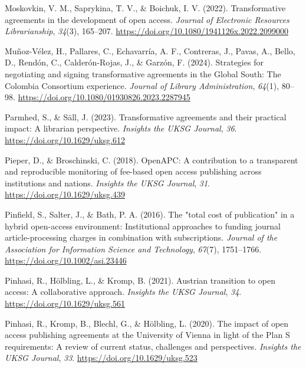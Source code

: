 \documentclass[a4paper,man,floatsintext,longtable,noextraspace,12pt]{apa6}
\newenvironment{CSLReferences}%
  {}%
  {\par}
\begin{document}
\begin{CSLReferences}{1}{0}
\leavevmode{}%
Moskovkin, V. M., Saprykina, T. V., \& Boichuk, I. V. (2022).
Transformative agreements in the development of open access.
\emph{Journal of Electronic Resources Librarianship}, \emph{34}(3),
165--207. \url{https://doi.org/10.1080/1941126x.2022.2099000}

\leavevmode{}%
Muñoz-Vélez, H., Pallares, C., Echavarría, A. F., Contreras, J., Pavas,
A., Bello, D., Rendón, C., Calderón-Rojas, J., \& Garzón, F. (2024).
Strategies for negotiating and signing transformative agreements in the
{Global South}: The {Colombia Consortium} experience. \emph{Journal of
Library Administration}, \emph{64}(1), 80--98.
\url{https://doi.org/10.1080/01930826.2023.2287945}

\leavevmode{}%
Parmhed, S., \& Säll, J. (2023). Transformative agreements and their
practical impact: A librarian perspective. \emph{Insights the UKSG
Journal}, \emph{36}. \url{https://doi.org/10.1629/uksg.612}

\leavevmode{}%
Pieper, D., \& Broschinski, C. (2018). {OpenAPC}: A contribution to a
transparent and reproducible monitoring of fee-based open access
publishing across institutions and nations. \emph{Insights the {UKSG}
Journal}, \emph{31}. \url{https://doi.org/10.1629/uksg.439}

\leavevmode{}%
Pinfield, S., Salter, J., \& Bath, P. A. (2016). The "total cost of
publication" in a hybrid open-access environment: Institutional
approaches to funding journal article-processing charges in combination
with subscriptions. \emph{Journal of the Association for Information
Science and Technology}, \emph{67}(7), 1751--1766.
\url{https://doi.org/10.1002/asi.23446}

\leavevmode{}%
Pinhasi, R., Hölbling, L., \& Kromp, B. (2021). Austrian transition to
open access: A collaborative approach. \emph{Insights the UKSG Journal},
\emph{34}. \url{https://doi.org/10.1629/uksg.561}

\leavevmode{}%
Pinhasi, R., Kromp, B., Blechl, G., \& Hölbling, L. (2020). The impact
of open access publishing agreements at the {University of Vienna} in
light of the {Plan S} requirements: A review of current status,
challenges and perspectives. \emph{Insights the UKSG Journal},
\emph{33}. \url{https://doi.org/10.1629/uksg.523}


\end{CSLReferences}
\end{document}
